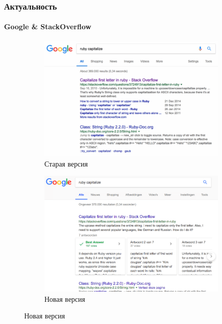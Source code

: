 \documentclass[10pt]{beamer}
\begin{document}
\begin{frame}
\frametitle{Актуальность}
\framesubtitle{Google \& StackOverflow}

\begin{figure}
	\begin{subfigure}[b]{0.49\linewidth}
		\centering
		\includegraphics[width=\linewidth]{images/google_search_old.png}
		\caption{Старая версия}
	\end{subfigure}\hfill
	\begin{subfigure}[b]{0.49\linewidth}
		\centering
		\includegraphics[width=\linewidth]{images/google_search_new.png}
		\caption{Новая версия}
	\end{subfigure}
\end{figure}

\end{frame}

\end{document}

